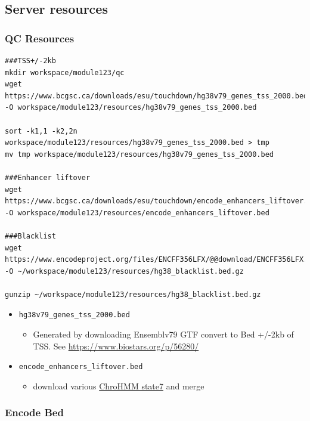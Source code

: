 \documentclass[
]{book}
\providecommand{\tightlist}{%
  \setlength{\itemsep}{0pt}\setlength{\parskip}{0pt}}
\begin{document}
\subsection{Server resources}\label{server-resources-2}

\subsubsection{QC Resources}\label{qc-resources-2}

\begin{verbatim}
###TSS+/-2kb
mkdir workspace/module123/qc
wget https://www.bcgsc.ca/downloads/esu/touchdown/hg38v79_genes_tss_2000.bed -O workspace/module123/resources/hg38v79_genes_tss_2000.bed

sort -k1,1 -k2,2n workspace/module123/resources/hg38v79_genes_tss_2000.bed > tmp
mv tmp workspace/module123/resources/hg38v79_genes_tss_2000.bed

###Enhancer liftover
wget https://www.bcgsc.ca/downloads/esu/touchdown/encode_enhancers_liftover.bed -O workspace/module123/resources/encode_enhancers_liftover.bed

###Blacklist
wget https://www.encodeproject.org/files/ENCFF356LFX/@@download/ENCFF356LFX.bed.gz -O ~/workspace/module123/resources/hg38_blacklist.bed.gz

gunzip ~/workspace/module123/resources/hg38_blacklist.bed.gz
\end{verbatim}

\begin{itemize}
\tightlist
\item
  \texttt{hg38v79\_genes\_tss\_2000.bed}

  \begin{itemize}
  \tightlist
  \item
    Generated by downloading Ensemblv79 GTF convert to Bed +/-2kb of TSS. See \url{https://www.biostars.org/p/56280/}
  \end{itemize}
\item
  \texttt{encode\_enhancers\_liftover.bed}

  \begin{itemize}
  \tightlist
  \item
    download various \href{https://egg2.wustl.edu/roadmap/data/byFileType/chromhmmSegmentations/ChmmModels/coreMarks/jointModel/final/}{ChroHMM state7} and merge
  \end{itemize}
\end{itemize}

\subsubsection{Encode Bed}\label{encode-bed-2}
\end{document}
